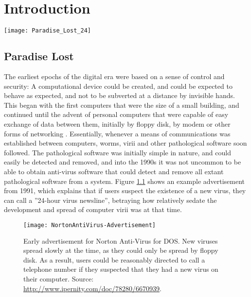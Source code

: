 
\chapter{Introduction} %

\label{Chapter 1} %

\texttt{[image: Paradise\_Lost\_24]}

\section{Paradise Lost}

\label{Ch1 Sec1}

The earliest epochs of the digital era were based on a sense of control and security:  A computational device could be
created, and could be expected to behave as expected, and not to be subverted at a distance by invisible hands.
This began with the first computers that were the size of a small building, and continued until the advent of personal
computers that were capable of easy exchange of data between them, initially by floppy disk, by modem or
other forms of networking \cite{chen2004evolution}. 
Essentially, whenever a means of communications was established between computers, worms, virii and other
pathological software soon followed.   
The pathological software was initially simple in nature, and could easily be detected and removed, and into the 1990s it was not uncommon to be able to obtain anti-virus software that could detect and remove all extant pathological software from a system.
Figure \ref{fig:nortonad} shows an example advertisement from 1991, which explains that if users suspect the existence of a new virus, they can call a ''24-hour virus newsline'', betraying how relatively sedate the development and spread of computer virii was at that time.

\begin{figure}
  \centering
  \texttt{[image: NortonAntiVirus-Advertisement]}
  \caption{Early advertisement for Norton Anti-Virus for DOS. New viruses spread slowly at the time, as they could
    only be spread by floppy disk. As a result, users could be reasonably directed to call a telephone number if they
    suspected that they had a new virus on their computer. Source: \url{http://www.ipernity.com/doc/78280/6670939}.
  }
  \label{fig:nortonad}
\end{figure}

